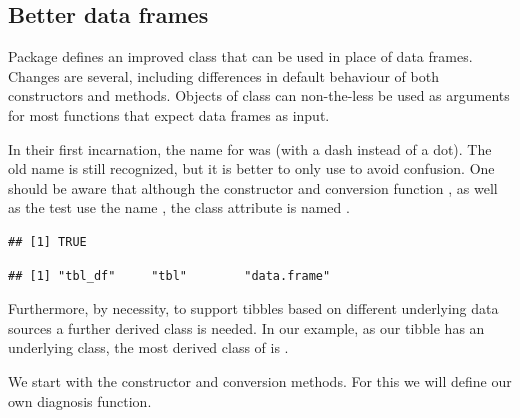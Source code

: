 \documentclass[krantz2,ChapterTOCs]{krantz}\usepackage{knitr}
\begin{document}
\subsection{Better data frames}

Package  defines an improved class  that can be used in place of data frames. Changes are several, including differences in default behaviour of both constructors and methods. Objects of class  can non-the-less be used as arguments for most functions that expect data frames as input.

\begin{infobox}
In their first incarnation, the name for  was  (with a dash instead of a dot). The old name is still recognized, but it is better to only use  to avoid confusion. One should be aware that although the constructor  and conversion function , as well as the test  use the name , the class attribute is named .

\begin{knitrout}\footnotesize
{}\color{fgcolor}\begin{kframe}
\begin{alltt}
 \hlkwb{<-} \hlstd{(} \hlstd{=} \hlopt{:}\hlstd{)}
\end{alltt}
\begin{verbatim}
## [1] TRUE
\end{verbatim}
\begin{alltt}
\end{alltt}
\begin{verbatim}
## [1] "tbl_df"     "tbl"        "data.frame"
\end{verbatim}
\end{kframe}
\end{knitrout}

Furthermore, by necessity, to support tibbles based on different underlying data sources a further derived class is needed. In our example, as our tibble has an underlying  class, the most derived class of  is .
\end{infobox}

We start with the constructor and conversion methods. For this we will define our own diagnosis function.
\end{document}
